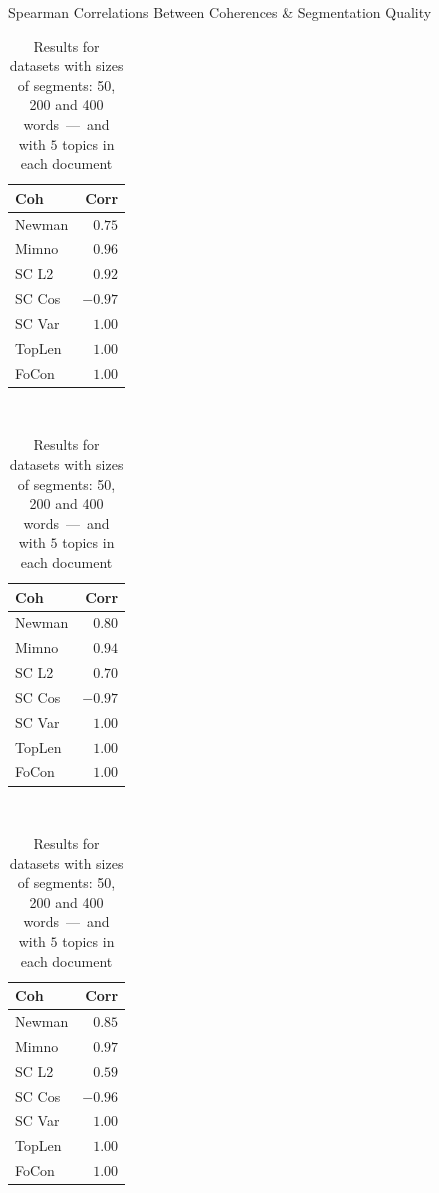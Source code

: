 \documentclass[russian]{beamer}
\begin{document}
\begin{frame}{Spearman Correlations Between Coherences \& Segmentation Quality}
  \begin{table}[t]
    \begin{tabular}{lr}
      Coh & Corr\\
      \toprule
      Newman & $0.75$\\
      Mimno & $0.96$\\
      \midrule
      SC L2 & $0.92$\\
      SC Cos & $-0.97$\\
      SC Var & $\mathbf{1.00}$\\
      TopLen & $\mathbf{1.00}$\\
      FoCon & $\mathbf{1.00}$\\
      \bottomrule
    \end{tabular}
    ~
    \begin{tabular}{lr}
      Coh & Corr\\
      \toprule
      Newman & $0.80$\\
      Mimno & $0.94$\\
      \midrule
      SC L2 & $0.70$\\
      SC Cos & $-0.97$\\
      SC Var & $\mathbf{1.00}$\\
      TopLen & $\mathbf{1.00}$\\
      FoCon & $\mathbf{1.00}$\\
      \bottomrule
    \end{tabular}
    ~
    \begin{tabular}{lr}
      Coh & Corr\\
      \toprule
      Newman & $0.85$\\
      Mimno & $0.97$\\
      \midrule
      SC L2 & $0.59$\\
      SC Cos & $-0.96$\\
      SC Var & $\mathbf{1.00}$\\
      TopLen & $\mathbf{1.00}$\\
      FoCon & $\mathbf{1.00}$\\
      \bottomrule
    \end{tabular}
    \centering
    \captionsetup{justification=centering}
    \caption*{
      Results for datasets with sizes of segments: 50, 200 and 400 words~---~and with $5$ topics in each document}
  \end{table}
\end{frame}
\end{document}
